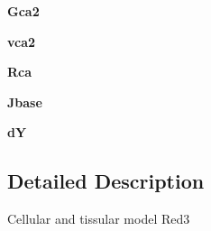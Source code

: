 \begin{DoxyCompactItemize}
\item 
\hypertarget{classcell__mdl2_1_1_red3_a717bbb86c8afe169ebbf84b4f01998a8}{
{\bfseries Gca2}}
\label{classcell__mdl2_1_1_red3_a717bbb86c8afe169ebbf84b4f01998a8}

\item 
\hypertarget{classcell__mdl2_1_1_red3_aa783a2b833729df8570b0f66be441529}{
{\bfseries vca2}}
\label{classcell__mdl2_1_1_red3_aa783a2b833729df8570b0f66be441529}

\item 
\hypertarget{classcell__mdl2_1_1_red3_a99e0a0d42db1d5146e1db7d9def4d875}{
{\bfseries Rca}}
\label{classcell__mdl2_1_1_red3_a99e0a0d42db1d5146e1db7d9def4d875}

\item 
\hypertarget{classcell__mdl2_1_1_red3_a069197a6f80b4b40b374f98744011311}{
{\bfseries Jbase}}
\label{classcell__mdl2_1_1_red3_a069197a6f80b4b40b374f98744011311}

\item 
\hypertarget{classcell__mdl2_1_1_red3_a90011e7d69aec5376e286b72ae9e0730}{
{\bfseries dY}}
\label{classcell__mdl2_1_1_red3_a90011e7d69aec5376e286b72ae9e0730}

\end{DoxyCompactItemize}


\subsection{Detailed Description}
\begin{DoxyVerb}Cellular and tissular model Red3\end{DoxyVerb}
 

